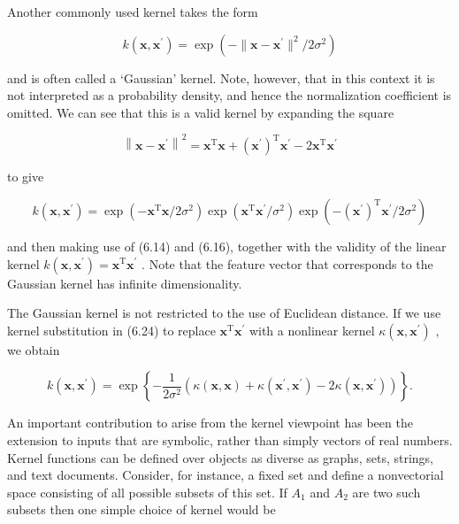 \documentclass[
  10
]{article}
\begin{document}
Another commonly used kernel takes the form

\[
k (\mathbf {x}, \mathbf {x} ^ {\prime}) = \exp \left(- \| \mathbf {x} - \mathbf {x} ^ {\prime} \| ^ {2} / 2 \sigma^ {2}\right)\tag{6.23}
\]

and is often called a `Gaussian' kernel. Note, however, that in this
context it is not interpreted as a probability density, and hence the
normalization coefficient is omitted. We can see that this is a valid
kernel by expanding the square

\[
\left\| \mathbf {x} - \mathbf {x} ^ {\prime} \right\| ^ {2} = \mathbf {x} ^ {\mathrm{T}} \mathbf {x} + \left(\mathbf {x} ^ {\prime}\right) ^ {\mathrm{T}} \mathbf {x} ^ {\prime} - 2 \mathbf {x} ^ {\mathrm{T}} \mathbf {x} ^ {\prime}\tag{6.24}
\]

to give

\[
k (\mathbf {x}, \mathbf {x} ^ {\prime}) = \exp \left(- \mathbf {x} ^ {\mathrm{T}} \mathbf {x} / 2 \sigma^ {2}\right) \exp \left(\mathbf {x} ^ {\mathrm{T}} \mathbf {x} ^ {\prime} / \sigma^ {2}\right) \exp \left(- (\mathbf {x} ^ {\prime}) ^ {\mathrm{T}} \mathbf {x} ^ {\prime} / 2 \sigma^ {2}\right)\tag{6.25}
\]

and then making use of (6.14) and (6.16), together with the validity of
the linear kernel
\(k ( \mathbf { x } , \mathbf { x } ^ { \prime } ) = \mathbf { x } ^ { \mathrm { { T } } } \mathbf { x } ^ { \prime }\)
. Note that the feature vector that corresponds to the Gaussian kernel
has infinite dimensionality.

The Gaussian kernel is not restricted to the use of Euclidean distance.
If we use kernel substitution in (6.24) to replace
\(\mathbf { x } ^ { \mathrm { { T } } } \mathbf { x } ^ { \prime }\)
with a nonlinear kernel
\(\kappa ( \mathbf { x } , \mathbf { x } ^ { \prime } )\) , we obtain

\[
k (\mathbf {x}, \mathbf {x} ^ {\prime}) = \exp \left\{- \frac {1}{2 \sigma^ {2}} \left(\kappa (\mathbf {x}, \mathbf {x}) + \kappa (\mathbf {x} ^ {\prime}, \mathbf {x} ^ {\prime}) - 2 \kappa (\mathbf {x}, \mathbf {x} ^ {\prime})\right) \right\}.\tag{6.26}
\]

An important contribution to arise from the kernel viewpoint has been
the extension to inputs that are symbolic, rather than simply vectors of
real numbers. Kernel functions can be defined over objects as diverse as
graphs, sets, strings, and text documents. Consider, for instance, a
fixed set and define a nonvectorial space consisting of all possible
subsets of this set. If \(A _ { 1 }\) and \(A _ { 2 }\) are two such
subsets then one simple choice of kernel would be
\end{document}
